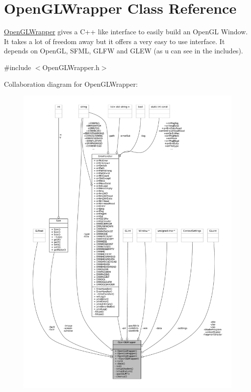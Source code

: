 \hypertarget{classOpenGLWrapper}{}\section{Open\+G\+L\+Wrapper Class Reference}
\label{classOpenGLWrapper}


\mbox{\hyperlink{classOpenGLWrapper}{Open\+G\+L\+Wrapper}} gives a C++ like interface to easily build an Open\+GL Window. It takes a lot of freedom away but it offers a very easy to use interface. It depends on Open\+GL, S\+F\+ML, G\+L\+FW and G\+L\+EW (as u can see in the includes).  




{\ttfamily \#include $<$Open\+G\+L\+Wrapper.\+h$>$}



Collaboration diagram for Open\+G\+L\+Wrapper\+:\nopagebreak
\begin{figure}[H]
\begin{center}
\leavevmode
\includegraphics[width=350pt]{classOpenGLWrapper__coll__graph}
\end{center}
\end{figure}
